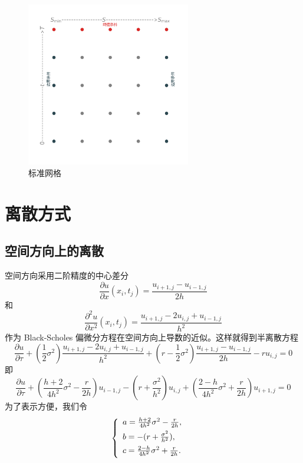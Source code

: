 \documentclass{article}
\begin{document}
\begin{figure}[H]
  \centering
  \includegraphics[width=0.64\textwidth,height=0.64\textwidth]{Images/1_grid.png}
  \caption{标准网格}
  \label{fig:1_grid}
\end{figure} 



\newpage
\section{离散方式}


\subsection{空间方向上的离散}

空间方向采用二阶精度的中心差分
$$\frac{\partial u}{\partial x}(x_i, t_j) = \frac{u_{i+1, j} - u_{i-1, j}}{2h}$$
和
$$\frac{\partial^2 u}{\partial x^2}(x_i, t_j) = \frac{u_{i+1, j} - 2u_{i, j} + u_{i-1, j}}{h^2}$$
作为 Black-Scholes 偏微分方程在空间方向上导数的近似。这样就得到半离散方程
$$\frac{\partial u}{\partial \tau} + (\frac{1}{2}\sigma^2)\frac{u_{i+1, j} - 2u_{i, j} + u_{i-1, j}}{h^2} + (r - \frac{1}{2}\sigma^2)\frac{u_{i+1, j} - u_{i-1, j}}{2h} - ru_{i, j} = 0$$
即$$\frac{\partial u}{\partial \tau} + (\frac{h+2}{4h^2}\sigma^2 - \frac{r}{2h})u_{i-1, j} - (r + \frac{\sigma^2}{h^2})u_{i, j} + (\frac{2-h}{4h^2}\sigma^2 + \frac{r}{2h})u_{i+1, j} = 0$$
为了表示方便，我们令
\begin{equation}
\left\{
        \begin{array}{lr}
        \vspace{1ex}
        a = \frac{h+2}{4h^2}\sigma^2 - \frac{r}{2h}, & \\
        \vspace{1ex}
        b = -(r + \frac{\sigma^2}{h^2}), & \\
        \vspace{1ex}
        c = \frac{2-h}{4h^2}\sigma^2 + \frac{r}{2h}. &  
        \end{array}
\right.
\nonumber
\end{equation}
\end{document}
